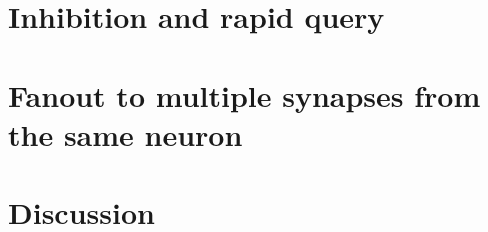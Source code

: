 \documentclass[twocolumn]{article}
\begin{document}
\section{\label{sec:inhibition_and_rapid_query}Inhibition and rapid query}

\begin{figure} 
\end{figure}

\begin{figure} 
\end{figure}

\section{\label{sec:fluxonic_fanout}Fanout to multiple synapses from the same neuron}

\section{\label{sec:discussion}Discussion}
	
\newpage
\appendix



\end{document}
